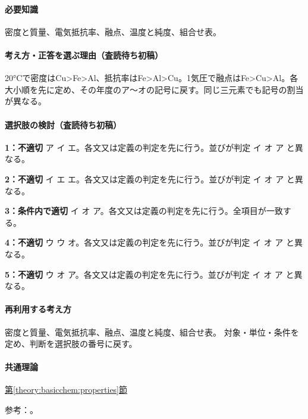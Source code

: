 \paragraph{必要知識} 密度と質量、電気抵抗率、融点、温度と純度、組合せ表。

\paragraph{考え方・正答を選ぶ理由（査読待ち初稿）} 20°Cで密度はCu>Fe>Al、抵抗率はFe>Al>Cu。1気圧で融点はFe>Cu>Al。各大小順を先に定め、その年度のア〜オの記号に戻す。同じ三元素でも記号の割当が異なる。

\paragraph{選択肢の検討（査読待ち初稿）}\mbox{}\par

\noindent\textbf{1：不適切} ア イ エ。各文又は定義の判定を先に行う。並びが判定 イ オ ア と異なる。\par

\noindent\textbf{2：不適切} イ エ エ。各文又は定義の判定を先に行う。並びが判定 イ オ ア と異なる。\par

\noindent\textbf{3：条件内で適切} イ オ ア。各文又は定義の判定を先に行う。全項目が一致する。\par

\noindent\textbf{4：不適切} ウ ウ オ。各文又は定義の判定を先に行う。並びが判定 イ オ ア と異なる。\par

\noindent\textbf{5：不適切} ウ オ ア。各文又は定義の判定を先に行う。並びが判定 イ オ ア と異なる。\par

\paragraph{再利用する考え方} 密度と質量、電気抵抗率、融点、温度と純度、組合せ表。 対象・単位・条件を定め、判断を選択肢の番号に戻す。

\paragraph{共通理論} \hyperref[theory:basicchem:properties]{第\ref*{theory:basicchem:properties}節}

\par 参考：\cite{openstax_resistivity,chem55_properties,chem55_properties_al,chem55_properties_fe}。

